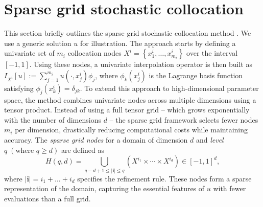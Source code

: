 \section{Sparse grid stochastic collocation}\label{sec:SC}
This section briefly outlines the sparse grid stochastic collocation method \cite{BaNoRi:2000, KlBa:2005, MaNi:2009, Sm:1963}. We use a generic solution $u$ for illustration. The approach starts by defining a univariate set of $m_i$ collocation nodes $X^i = \left\{x_1^i,\ldots, x_{m_i}^i\right\}$ over the interval $[-1,1]$. Using these nodes, a univariate interpolation operator is then built as $I_{X^{i}}[u]:=\sum_{j=1}^{m_{i}} u(\cdot, x_j^i)\phi_j$, where $\phi_k(x_j^i)$ is the Lagrange basis function satisfying $\phi_j(x_k^i) = \delta_{jk}$. To extend this approach to high-dimensional parameter space, the method combines univariate nodes across multiple dimensions using a tensor product. Instead of using a full tensor grid -- which grows exponentially with the number of dimensions $d$ -- the sparse grid framework selects fewer nodes $m_i$ per dimension, drastically reducing computational costs while maintaining accuracy. The {\it sparse grid nodes} for a domain of dimension $d$ and {\it level} $q\; (\text{where }q\ge d)$ are defined as
%
\begin{equation*}
H(q,d) = \bigcup_{q-d+1\le|\boldsymbol{i}|\le q} \left(X^{i_1}\times \cdots\times X^{i_d}\right)\in [-1,1]^d, 
\end{equation*}
where $|\boldsymbol{i}| = i_1+\ldots+i_d$ specifies the refinement rule. These nodes form a sparse representation of the domain, capturing the essential features of $u$ with fewer evaluations than a full grid. 



